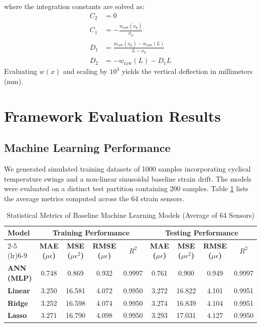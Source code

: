 \documentclass[11pt,journal,onecolumn]{IEEEtran}
\begin{document}
where the integration constants are solved as:
\begin{align}
    C_2 &= 0 \\
    C_1 &= -\frac{w_{\text{raw}}(x_p)}{x_p} \\
    D_1 &= \frac{w_{\text{raw}}(x_p) - w_{\text{raw}}(L)}{L - x_p} \\
    D_2 &= -w_{\text{raw}}(L) - D_1 L
\end{align}
Evaluating $w(x)$ and scaling by $10^3$ yields the vertical deflection in millimeters (mm).

\section{Framework Evaluation Results}

\subsection{Machine Learning Performance}
We generated simulated training datasets of 1000 samples incorporating cyclical temperature swings and a non-linear sinusoidal baseline strain drift. The models were evaluated on a distinct test partition containing 200 samples. Table \ref{tab:ml_metrics} lists the average metrics computed across the 64 strain sensors.

\begin{table}[htbp]
\centering
\caption{Statistical Metrics of Baseline Machine Learning Models (Average of 64 Sensors)}
\label{tab:ml_metrics}
\begin{tabular}{lcccccccc}
\toprule
\textbf{Model} & \multicolumn{4}{c}{\textbf{Training Performance}} & \multicolumn{4}{c}{\textbf{Testing Performance}} \\
\cmidrule(lr){2-5} \cmidrule(lr){6-9}
& \textbf{MAE ($\mu\epsilon$)} & \textbf{MSE ($\mu\epsilon^2$)} & \textbf{RMSE ($\mu\epsilon$)} & \textbf{$R^2$} & \textbf{MAE ($\mu\epsilon$)} & \textbf{MSE ($\mu\epsilon^2$)} & \textbf{RMSE ($\mu\epsilon$)} & \textbf{$R^2$} \\
\midrule
\textbf{ANN (MLP)} & 0.748 & 0.869 & 0.932 & 0.9997 & 0.761 & 0.900 & 0.949 & 0.9997 \\
\textbf{Linear}    & 3.250 & 16.581 & 4.072 & 0.9950 & 3.272 & 16.822 & 4.101 & 0.9951 \\
\textbf{Ridge}     & 3.252 & 16.598 & 4.074 & 0.9950 & 3.274 & 16.839 & 4.104 & 0.9951 \\
\textbf{Lasso}     & 3.271 & 16.790 & 4.098 & 0.9950 & 3.293 & 17.031 & 4.127 & 0.9950 \\
\bottomrule
\end{tabular}
\end{table}
\end{document}
